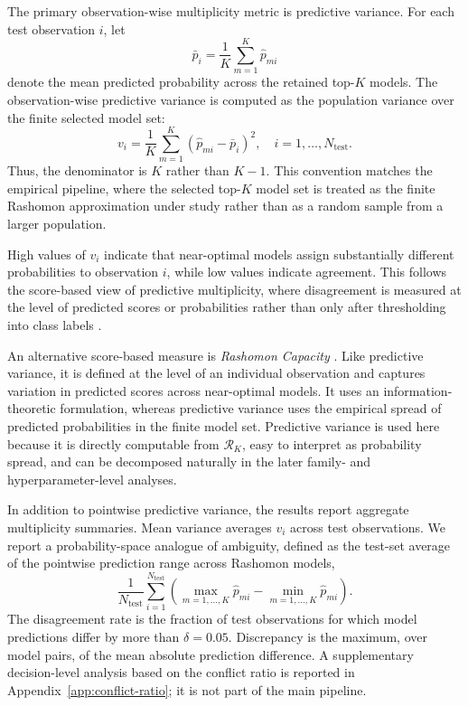 The primary observation-wise multiplicity metric is predictive variance. For each test
observation \(i\), let
\[
\bar{p}_i =
\frac{1}{K}
\sum_{m=1}^{K}
\hat{p}_{mi}
\]
denote the mean predicted probability across the retained top-\(K\) models. The
observation-wise predictive variance is computed as the population variance over the
finite selected model set:
\[
v_i =
\frac{1}{K}
\sum_{m=1}^{K}
\left(\hat{p}_{mi} - \bar{p}_i\right)^2,
\quad i=1,\dots,N_{\mathrm{test}}.
\]
Thus, the denominator is \(K\) rather than \(K-1\). This convention matches the empirical
pipeline, where the selected top-\(K\) model set is treated as the finite Rashomon
approximation under study rather than as a random sample from a larger population.

High values of $v_i$ indicate that near-optimal models assign substantially different
probabilities to observation $i$, while low values indicate agreement. This follows the
score-based view of predictive multiplicity, where disagreement is measured at the level
of predicted scores or probabilities rather than only after thresholding into class labels
\citep{watson-daniels_predictive_2023, hsu_rashomon_nodate}.

An alternative score-based measure is \emph{Rashomon Capacity}
\citep{hsu_rashomon_nodate}. Like predictive variance, it is defined at the level of an
individual observation and captures variation in predicted scores across near-optimal
models. It uses an information-theoretic formulation, whereas predictive variance uses the
empirical spread of predicted probabilities in the finite model set. Predictive variance is
used here because it is directly computable from $\mathcal{R}_K$, easy to interpret as
probability spread, and can be decomposed naturally in the later family- and
hyperparameter-level analyses.

In addition to pointwise predictive variance, the results report aggregate multiplicity
summaries. Mean variance averages $v_i$ across test observations. We report a probability-space
analogue of ambiguity, defined as the test-set average of
the pointwise prediction range across Rashomon models,
\[
\frac{1}{N_{\mathrm{test}}}
\sum_{i=1}^{N_{\mathrm{test}}}
\left(
\max_{m=1,\dots,K} \hat{p}_{mi}
-
\min_{m=1,\dots,K} \hat{p}_{mi}
\right).
\] The disagreement rate is the fraction of
test observations for which model predictions differ by more than $\delta=0.05$.
Discrepancy is the maximum, over model pairs, of the mean absolute prediction
difference. A supplementary decision-level analysis based on the conflict ratio is reported
in Appendix~\ref{app:conflict-ratio}; it is not part of the main pipeline.

